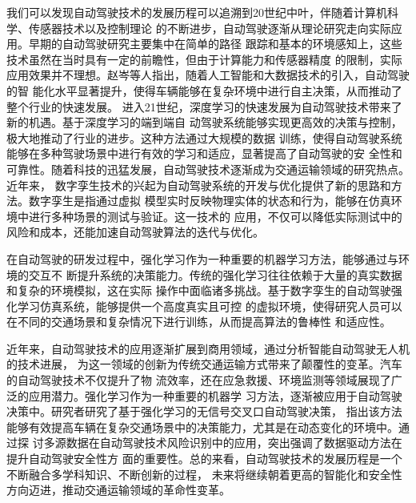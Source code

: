 我们可以发现自动驾驶技术的发展历程可以追溯到20世纪中叶，伴随着计算机科学、传感器技术以及控制理论
的不断进步，自动驾驶逐渐从理论研究走向实际应用。早期的自动驾驶研究主要集中在简单的路径
跟踪和基本的环境感知上，这些技术虽然在当时具有一定的前瞻性，但由于计算能力和传感器精度
的限制，实际应用效果并不理想。赵岑等人指出，随着人工智能和大数据技术的引入，自动驾驶的智
能化水平显著提升，使得车辆能够在复杂环境中进行自主决策，从而推动了整个行业的快速发展\cite{小龙刘2024人工智能和大数据技术在自动驾驶中的应用}。
进入21世纪，深度学习的快速发展为自动驾驶技术带来了新的机遇。基于深度学习的端到端自
动驾驶系统能够实现更高效的决策与控制，极大地推动了行业的进步。这种方法通过大规模的数据
训练，使得自动驾驶系统能够在多种驾驶场景中进行有效的学习和适应，显著提高了自动驾驶的安
全性和可靠性。随着科技的迅猛发展，自动驾驶技术逐渐成为交通运输领域的研究热点\cite{丘德龙2018浅谈人工智能在汽车领域中的应用}。近年来，
数字孪生技术的兴起为自动驾驶系统的开发与优化提供了新的思路和方法。数字孪生是指通过虚拟
模型实时反映物理实体的状态和行为，能够在仿真环境中进行多种场景的测试与验证\cite{罗健炜2023基于数字孪生的自动驾驶仿真测试研究}。这一技术的
应用，不仅可以降低实际测试中的风险和成本，还能加速自动驾驶算法的迭代与优化。

在自动驾驶的研发过程中，强化学习作为一种重要的机器学习方法，能够通过与环境的交互不
断提升系统的决策能力。传统的强化学习往往依赖于大量的真实数据和复杂的环境模拟，这在实际
操作中面临诸多挑战。基于数字孪生的自动驾驶强化学习仿真系统，能够提供一个高度真实且可控
的虚拟环境\cite{梁恩云2021基于数字孪生的自动驾驶交通场景构建研究}，使得研究人员可以在不同的交通场景和复杂情况下进行训练，从而提高算法的鲁棒性
和适应性。

近年来，自动驾驶技术的应用逐渐扩展到商用领域，通过分析智能自动驾驶无人机的技术进展，
为这一领域的创新为传统交通运输方式带来了颠覆性的变革\cite{方韶剑2024基于深度学习的智能自动驾驶无人机技术分析}。汽车的自动驾驶技术不仅提升了物
流效率，还在应急救援、环境监测等领域展现了广泛的应用潜力。强化学习作为一种重要的机器学
习方法，逐渐被应用于自动驾驶决策中。研究者研究了基于强化学习的无信号交叉口自动驾驶决策\cite{李文娜2024自动驾驶汽车闯红灯预警数字孪生道路测试}，
指出该方法能够有效提高车辆在复杂交通场景中的决策能力，尤其是在动态变化的环境中。通过探
讨多源数据在自动驾驶技术风险识别中的应用，突出强调了数据驱动方法在提升自动驾驶安全性方
面的重要性。总的来看，自动驾驶技术的发展历程是一个不断融合多学科知识、不断创新的过程，
未来将继续朝着更高的智能化和安全性方向迈进，推动交通运输领域的革命性变革。







